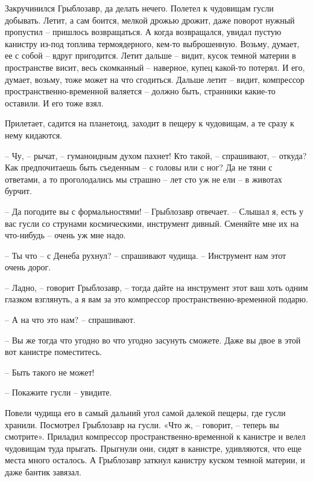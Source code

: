 \documentclass[ebook,oneside,final,openright]{memoir}
\begin{document}
\par
Закручинился Грыблозавр, да делать нечего. Полетел к чудовищам гусли добывать. Летит, а сам боится, мелкой дрожью дрожит, даже поворот нужный пропустил – пришлось возвращаться. А когда возвращался, увидал пустую канистру из-под топлива термоядерного, кем-то выброшенную. Возьму, думает, ее с собой – вдруг пригодится. Летит дальше – видит, кусок темной материи в пространстве висит, весь скомканный – наверное, купец какой-то потерял. И его, думает, возьму, тоже может на что сгодиться. Дальше летит – видит, компрессор пространственно-временной валяется – должно быть, странники какие-то оставили. И его тоже взял.\par
\par
Прилетает, садится на планетоид, заходит в пещеру к чудовищам, а те сразу к нему кидаются. \par
– Чу, – рычат, – гуманоидным духом пахнет! Кто такой, – спрашивают, – откуда? Как предпочитаешь быть съеденным – с головы или с ног? Да не тяни с ответами, а то проголодались мы страшно – лет сто уж не ели – в животах бурчит.\par
– Да погодите вы с формальностями! – Грыблозавр отвечает. – Слышал я, есть у вас гусли со струнами космическими, инструмент дивный. Сменяйте мне их на что-нибудь – очень уж мне надо.\par
– Ты что – с Денеба рухнул? – спрашивают чудища. – Инструмент нам этот очень дорог.\par
– Ладно, – говорит Грыблозавр, – тогда дайте на инструмент этот ваш хоть одним глазком взглянуть, а я вам за это компрессор пространственно-временной подарю.\par
– А на что это нам? – спрашивают.\par
– Вы же тогда что угодно во что угодно засунуть сможете. Даже вы двое в этой вот канистре поместитесь. \par
– Быть такого не может!\par
– Покажите гусли – увидите.\par
\par
Повели чудища его в самый дальний угол самой далекой пещеры, где гусли хранили. Посмотрел Грыблозавр на гусли. «Что ж, – говорит, – теперь вы смотрите». Приладил компрессор пространственно-временной к канистре и велел чудовищам туда прыгать. Прыгнули они, сидят в канистре, удивляются, что еще места много осталось. А Грыблозавр заткнул канистру куском темной материи, и даже бантик завязал.\par
\par
\end{document}
